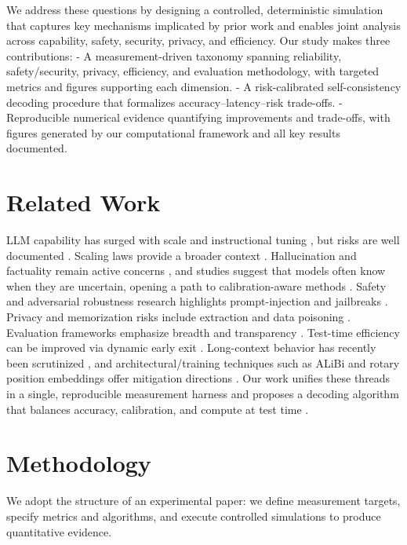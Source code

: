 \documentclass[10pt]{article}
\begin{document}
We address these questions by designing a controlled, deterministic simulation that captures key mechanisms implicated by prior work and enables joint analysis across capability, safety, security, privacy, and efficiency. Our study makes three contributions:
- A measurement-driven taxonomy spanning reliability, safety/security, privacy, efficiency, and evaluation methodology, with targeted metrics and figures supporting each dimension.
- A risk-calibrated self-consistency decoding procedure that formalizes accuracy–latency–risk trade-offs.
- Reproducible numerical evidence quantifying improvements and trade-offs, with figures generated by our computational framework and all key results documented.

\section{Related Work}
LLM capability has surged with scale \citep{Rae2021Gopher, Hoffmann2022Chinchilla} and instructional tuning \citep{Ouyang2022RLHF, Bai2022ConstitutionalAI}, but risks are well documented \citep{Bender2021StochasticParrots, Weidinger2021EthicalRisks, Bommasani2021FoundationModels}. Scaling laws provide a broader context \citep{Kaplan2020ScalingLaws}. Hallucination and factuality remain active concerns \citep{Ji2023HallucinationSurvey, Lin2022TruthfulQA}, and studies suggest that models often know when they are uncertain, opening a path to calibration-aware methods \citep{Kadavath2022KnowWhatKnow, Guo2017Calibration, Desai2020Calibration}. Safety and adversarial robustness research highlights prompt-injection and jailbreaks \citep{Perez2022RedTeam, Greshake2023IndirectPromptInjection, Zou2023UniversalJailbreaks}. Privacy and memorization risks include extraction and data poisoning \citep{Carlini2021ExtractingTrainingData, Carlini2023PoisoningWebScale}. Evaluation frameworks emphasize breadth and transparency \citep{Liang2022HELM, Kiela2021Dynabench}. Test-time efficiency can be improved via dynamic early exit \citep{Xin2020DeeBERT}. Long-context behavior has recently been scrutinized \citep{Liu2023LostInTheMiddle}, and architectural/training techniques such as ALiBi and rotary position embeddings offer mitigation directions \citep{Press2021ALiBi, Su2021RoFormer}. Our work unifies these threads in a single, reproducible measurement harness and proposes a decoding algorithm that balances accuracy, calibration, and compute at test time \citep{Wang2023SelfConsistency}.

\section{Methodology}
We adopt the structure of an experimental paper: we define measurement targets, specify metrics and algorithms, and execute controlled simulations to produce quantitative evidence.
\end{document}
